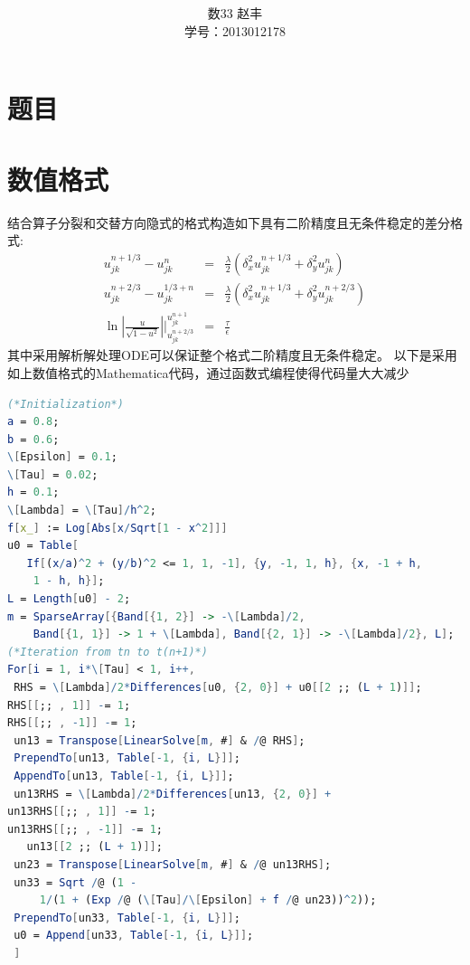 \documentclass[12pt]{article}
\theoremstyle{remark}
\begin{document}
\title{\textbf{}}
\author{数33 赵丰 \\学号：2013012178}

\maketitle
\large
\section{题目}

\section{数值格式}
结合算子分裂和交替方向隐式的格式构造如下具有二阶精度且无条件稳定的差分格式:
\begin{eqnarray*}
  u_{jk}^{n+1/3}-u_{jk}^{n} &=& \frac{\lambda}{2}(\delta^2_x u_{jk}^{n+1/3}+\delta^2_yu_{jk}^{n}) \\
  u_{jk}^{n+2/3}-u_{jk}^{1/3+n} &=& \frac{\lambda}{2}(\delta^2_x u_{jk}^{n+1/3}+\delta^2_yu_{jk}^{n+2/3}) \\
  \ln|\frac{u}{\sqrt{1-u^2}}|\biggr\rvert^{u_{jk}^{n+1}}_{u_{jk}^{n+2/3}}&=&\frac{\tau}{\epsilon}
\end{eqnarray*}
其中采用解析解处理ODE可以保证整个格式二阶精度且无条件稳定。
以下是采用如上数值格式的Mathematica代码，通过函数式编程使得代码量大大减少
\begin{lstlisting}[language=Mathematica]
(*Initialization*)
a = 0.8;
b = 0.6;
\[Epsilon] = 0.1;
\[Tau] = 0.02;
h = 0.1;
\[Lambda] = \[Tau]/h^2;
f[x_] := Log[Abs[x/Sqrt[1 - x^2]]]
u0 = Table[
   If[(x/a)^2 + (y/b)^2 <= 1, 1, -1], {y, -1, 1, h}, {x, -1 + h,
    1 - h, h}];
L = Length[u0] - 2;
m = SparseArray[{Band[{1, 2}] -> -\[Lambda]/2,
    Band[{1, 1}] -> 1 + \[Lambda], Band[{2, 1}] -> -\[Lambda]/2}, L];
(*Iteration from tn to t(n+1)*)
For[i = 1, i*\[Tau] < 1, i++,
 RHS = \[Lambda]/2*Differences[u0, {2, 0}] + u0[[2 ;; (L + 1)]];
RHS[[;; , 1]] -= 1;
RHS[[;; , -1]] -= 1;
 un13 = Transpose[LinearSolve[m, #] & /@ RHS];
 PrependTo[un13, Table[-1, {i, L}]];
 AppendTo[un13, Table[-1, {i, L}]];
 un13RHS = \[Lambda]/2*Differences[un13, {2, 0}] +
un13RHS[[;; , 1]] -= 1;
un13RHS[[;; , -1]] -= 1;
   un13[[2 ;; (L + 1)]];
 un23 = Transpose[LinearSolve[m, #] & /@ un13RHS];
 un33 = Sqrt /@ (1 -
     1/(1 + (Exp /@ (\[Tau]/\[Epsilon] + f /@ un23))^2));
 PrependTo[un33, Table[-1, {i, L}]];
 u0 = Append[un33, Table[-1, {i, L}]];
 ]
\end{lstlisting}
\end{document}
